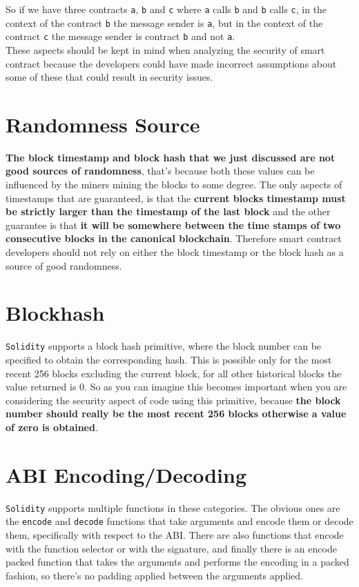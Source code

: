 So if we have three contracts \texttt{a}, \texttt{b} and \texttt{c} where \texttt{a} calls \texttt{b} and \texttt{b} calls \texttt{c}, in the context of the contract \texttt{b} the message sender is \texttt{a}, but in the context of the contract \texttt{c} the message sender is contract \texttt{b} and not \texttt{a}.\\

These aspects should be kept in mind when analyzing the security of smart contract because the developers could have made incorrect assumptions about some of these that could result in security issues.

\section{Randomness Source}
\textbf{The block timestamp and block hash that we just discussed are not good sources of randomness}, that's because both these values can be influenced by the miners mining the blocks to some degree. The only aspects of timestamps that are guaranteed, is that the \textbf{current blocks timestamp must be strictly larger than the timestamp of the last block} and the other guarantee is that \textbf{it will be somewhere between the time stamps of two consecutive blocks in the canonical blockchain}. Therefore smart contract developers should not rely on either the block timestamp or the block hash as a source of good randomness.

\section{Blockhash}
\texttt{Solidity} supports a block hash primitive, where the block number can be specified to obtain the corresponding hash. This is possible only for the most recent 256 blocks excluding the current block, for all other historical blocks the value returned is 0. So as you can imagine this becomes important when you are considering the security aspect of code using this primitive, because \textbf{the block number should really be the most recent 256 blocks otherwise a value of zero is obtained}.

\section{ABI Encoding/Decoding}
\texttt{Solidity} supports multiple functions in these categories. The obvious ones are the \texttt{encode} and \texttt{decode} functions that take arguments and encode them or decode them, specifically with respect to the ABI. There are also functions that encode with the function selector or with the signature, and finally there is an encode packed function that takes the arguments and performs the encoding in a packed fashion, so there's no padding applied between the arguments applied.\\

